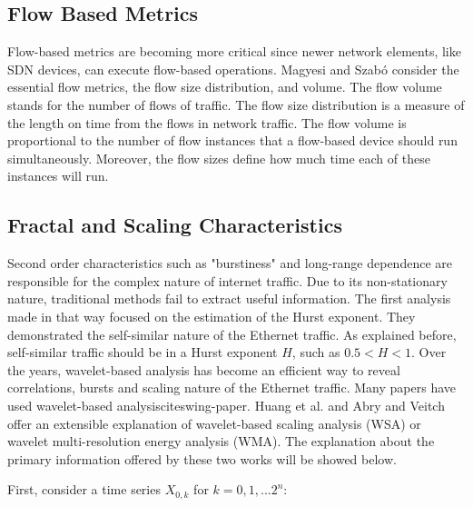 \subsection{Flow Based Metrics}


Flow-based metrics are becoming more critical since newer network elements, like SDN devices, can execute flow-based operations\cite{validate-trafficgen}\cite{sdn-survey}. Magyesi and Szabó\cite{validate-trafficgen} consider the essential flow metrics, the flow size distribution, and volume. The flow volume stands for the number of flows of traffic. The flow size distribution is a measure of the length on time from the flows in network traffic. The flow volume is proportional to the number of flow instances that a flow-based device should run simultaneously. Moreover, the flow sizes define how much time each of these instances will run.


\subsection{Fractal and Scaling Characteristics}

Second order characteristics such as "burstiness" and long-range dependence are responsible for the complex nature of internet traffic\cite{validate-trafficgen}. Due to its non-stationary nature, traditional methods fail to extract useful information\cite{validate-trafficgen}. The first analysis made in that way focused on the estimation of the Hurst exponent\cite{selfsimilar-ethernet}. They demonstrated the self-similar nature of the Ethernet traffic. As explained before, self-similar traffic should be in a Hurst exponent $H$, such as $0.5 < H < 1$. Over the years, wavelet-based analysis has become an efficient way to reveal correlations, bursts and scaling nature of the Ethernet traffic\cite{validate-trafficgen}. Many papers have used wavelet-based analysiscite{swing-paper}\cite{non-intrusive-wavelet}\cite{wavelet-analysis-long-range}. Huang et al.\cite{non-intrusive-wavelet} and Abry and Veitch\cite{wavelet-analysis-long-range} offer an extensible explanation of wavelet-based scaling analysis (\acrshort{WSA}) or wavelet multi-resolution energy analysis (\acrshort{WMA}). The explanation about the primary information offered by these two works will be showed below. 

First, consider a time series $X_{0,k}$ for $k = 0, 1, ... 2^n$:

